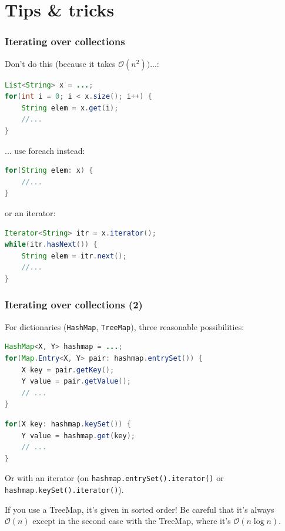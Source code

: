 \documentclass[8pt,aspectratio=169]{beamer}
\begin{document}
\section{Tips \& tricks}

\begin{frame}[fragile]
\frametitle{Iterating over collections}
{\color{red} Don't do this (because it takes $\mathcal{O}(n^2)) ...$:}
\begin{lstlisting}[language=Java, basicstyle=\tiny\ttfamily, frame=single, keywordstyle=\color{blue}]
List<String> x = ...;
for(int i = 0; i < x.size(); i++) {
	String elem = x.get(i);
	//...
}
\end{lstlisting}

{\color{blue} ... use foreach instead:}
\begin{lstlisting}[language=Java, basicstyle=\tiny\ttfamily, frame=single, keywordstyle=\color{blue}]
for(String elem: x) {
	//...
}
\end{lstlisting}
{\color{blue} or an iterator:}
\begin{lstlisting}[language=Java, basicstyle=\tiny\ttfamily, frame=single, keywordstyle=\color{blue}]
Iterator<String> itr = x.iterator();
while(itr.hasNext()) {
	String elem = itr.next();
	//...
}
\end{lstlisting}
\end{frame}

\begin{frame}[fragile]
\frametitle{Iterating over collections (2)}
For dictionaries (\texttt{HashMap}, \texttt{TreeMap}), three reasonable possibilities:
\begin{lstlisting}[language=Java, basicstyle=\tiny\ttfamily, frame=single, keywordstyle=\color{blue}]
HashMap<X, Y> hashmap = ...;
for(Map.Entry<X, Y> pair: hashmap.entrySet()) {
	X key = pair.getKey();
	Y value = pair.getValue();
	// ...
}
\end{lstlisting}

\begin{lstlisting}[language=Java, basicstyle=\tiny\ttfamily, frame=single, keywordstyle=\color{blue}]
for(X key: hashmap.keySet()) {
	Y value = hashmap.get(key);
	// ...
}
\end{lstlisting}

Or with an iterator (on \texttt{hashmap.entrySet().iterator()} or \texttt{hashmap.keySet().iterator()}).

If you use a TreeMap, it's given in sorted order! Be careful that it's always $\mathcal{O}(n)$ except in the second case with the TreeMap, where it's $\mathcal{O}(n \log n)$.
\end{frame}
\end{document}
